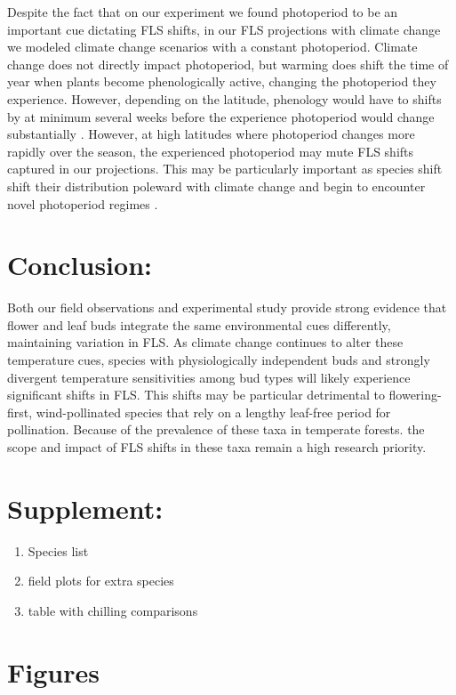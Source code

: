 \documentclass[11pt]{article}
\begin{document}
\noindent Despite the fact that on our experiment we found photoperiod to be an important cue dictating FLS shifts, in our FLS projections with climate change we modeled climate change scenarios with a constant photoperiod. Climate change does not directly impact photoperiod, but warming does shift the time of year when plants become phenologically active, changing the photoperiod they experience. However, depending on the latitude, phenology would have to shifts by at minimum several weeks before the experience photoperiod would change substantially \citep{Ettinger}. However, at high latitudes where photoperiod changes more rapidly over the season, the experienced photoperiod may mute FLS shifts captured in our projections. This may be particularly important as species shift shift their distribution poleward with climate change and begin to encounter novel photoperiod regimes \citep{}.\\

\section*{Conclusion:}
Both our field observations and experimental study provide strong evidence that flower and leaf buds integrate the same environmental cues differently, maintaining variation in FLS. As climate change continues to alter these temperature cues, species with physiologically independent buds and strongly divergent temperature sensitivities among bud types will likely experience significant shifts in FLS. This shifts may be particular detrimental to flowering-first, wind-pollinated species that rely on a lengthy leaf-free period for pollination. Because of the prevalence of these taxa in temperate forests. the scope and impact of FLS shifts in these taxa remain a high research priority.\\

\section*{Supplement:}
\begin{enumerate}
\item Species list
\item field plots for extra species
\item table with chilling comparisons
\end{enumerate}
 

\section{Figures}
\end{document}
